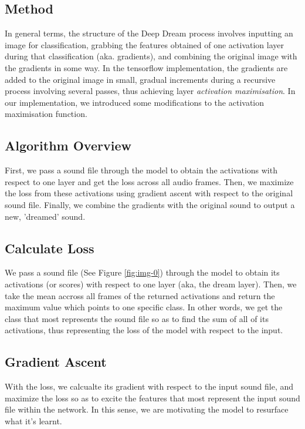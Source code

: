 \documentclass[a4paper,10pt,oneside]{article}
\begin{document}
\begin{sloppy}
\section{Method}

In general terms, the structure of the Deep Dream process involves inputting an image for classification, grabbing the features obtained of one activation layer during that classification (aka. gradients), and combining the original image with the gradients in some way. In the tensorflow implementation, the gradients are added to the original image in small, gradual increments during a recursive process involving several passes, thus achieving layer \textit{activation maximisation}. In our implementation, we introduced some modifications to the activation maximisation function.

\subsection{Algorithm Overview}

First, we pass a sound file through the model to obtain the activations with respect to one layer and get the loss across all audio frames. Then, we maximize the loss from these activations using gradient ascent with respect to the original sound file. Finally, we combine the gradients with the original sound to output a new, 'dreamed' sound.

\subsection{Calculate Loss}
We pass a sound file (See Figure \ref{fig:img-0}) through the model to obtain its activations (or scores) with respect to one layer (aka, the dream layer). Then, we take the mean accross all frames of the returned activations and return the maximum value which points to one specific class. In other words, we get the class that most represents the sound file so as to find the sum of all of its activations, thus representing the loss of the model with respect to the input.

\subsection{Gradient Ascent}
With the loss, we calcualte its gradient with respect to the input sound file, and maximize the loss so as to excite the features that most represent the input sound file within the network. In this sense, we are motivating the model to resurface what it's learnt. 


\end{sloppy}
\end{document}
